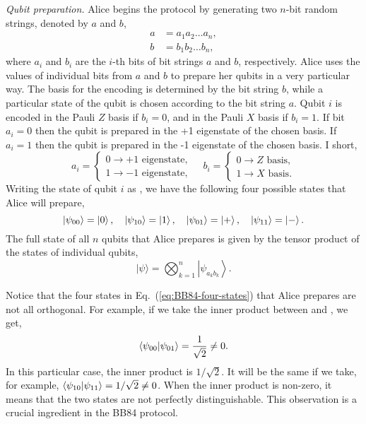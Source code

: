 \emph{Qubit preparation.}
Alice begins the protocol by generating two $n$-bit random strings, denoted by $a$ and $b$,
\begin{align}
    a & = a_1 a_2 \ldots a_n, \\
    b & = b_1 b_2 \ldots b_n,
\end{align}
where $a_i$ and $b_i$ are the $i$-th bits of bit strings $a$ and $b$, respectively.
Alice uses the values of individual bits from $a$ and $b$ to prepare her qubits in a very particular way.
The basis for the encoding is determined by the bit string $b$, while a particular state of the qubit is chosen according to the bit string $a$.
Qubit $i$ is encoded in the Pauli $Z$ basis if $b_i=0$, and in the Pauli $X$ basis if $b_i=1$.
If bit $a_i=0$ then the qubit is prepared in the +1 eigenstate of the chosen basis.
If $a_i=1$ then the qubit is prepared in the -1 eigenstate of the chosen basis.
I short,
\begin{equation}
    a_i = \begin{cases}
        0 \rightarrow +1\text{ eigenstate}, \\
        1 \rightarrow -1\text{ eigenstate},
    \end{cases}
    \quad
    b_i = \begin{cases}
        0 \rightarrow Z\text{ basis}, \\
        1 \rightarrow X\text{ basis}.
    \end{cases}
\end{equation}
Writing the state of qubit $i$ as , we have the following four possible states that Alice will prepare,
\begin{equation}
    \left| \psi_{00} \right\rangle = \left| 0 \right\rangle, \quad \left| \psi_{10} \right\rangle = \left| 1 \right\rangle, \quad \left| \psi_{01} \right\rangle = \left| + \right\rangle, \quad \left| \psi_{11} \right\rangle = \left| - \right\rangle.
    \label{eq:BB84-four-states}
\end{equation}
The full state of all $n$ qubits that Alice prepares is given by the tensor product of the states of individual qubits,
\begin{equation}
    |\psi\rangle=\bigotimes_{k=1}^n\left|\psi_{a_k b_k}\right\rangle.
\end{equation}

Notice that the four states in Eq.~(\ref{eq:BB84-four-states}) that Alice prepares are not all orthogonal.
For example, if we take the inner product between  and , we get,
\begin{equation}
    \langle \psi_{00}|\psi_{01} \rangle =\frac{1}{\sqrt{2}} \neq 0.
\end{equation}
In this particular case, the inner product is $1/\sqrt{2}$. It will be the same if we take, for example, 
$\langle \psi_{10}|\psi_{11} \rangle = 1/\sqrt{2} \ne 0$.
When the inner product is non-zero, it means that the two states are not perfectly distinguishable.
This observation is a crucial ingredient in the BB84 protocol. 

